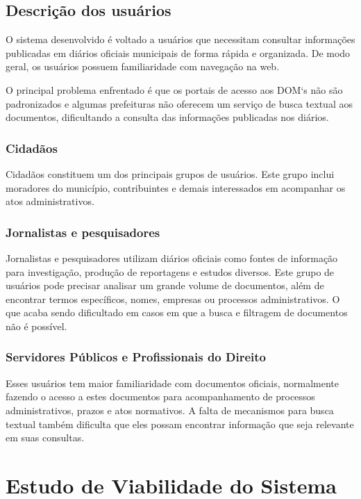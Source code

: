\subsection{Descrição dos usuários}
O sistema desenvolvido é voltado a usuários que necessitam consultar informações publicadas em diários oficiais municipais de forma rápida e organizada. De modo geral, os usuários possuem familiaridade com navegação na web.

O principal problema enfrentado é que os portais de acesso aos DOM`s não são padronizados e algumas prefeituras não oferecem um serviço de busca textual aos documentos, dificultando a consulta das informações publicadas nos diários.

\subsubsection{Cidadãos}
Cidadãos constituem um dos principais grupos de usuários. Este grupo inclui moradores do município, contribuintes e demais interessados em acompanhar os atos administrativos.

\subsubsection{Jornalistas e pesquisadores}
Jornalistas e pesquisadores utilizam diários oficiais como fontes de informação para investigação, produção de reportagens e estudos diversos.
Este grupo de usuários pode precisar analisar um grande volume de documentos, além de encontrar termos específicos, nomes, empresas ou processos administrativos. O que acaba sendo dificultado em casos em que a busca e filtragem de documentos não é possível.

\subsubsection{Servidores Públicos e Profissionais do Direito}
Esses usuários tem maior familiaridade com documentos oficiais, normalmente fazendo o acesso a estes documentos para acompanhamento de processos administrativos, prazos e atos normativos. A falta de mecanismos para busca textual também dificulta que eles possam encontrar informação que seja relevante em suas consultas.

\section{Estudo de Viabilidade do Sistema}

